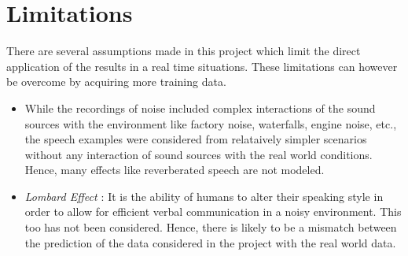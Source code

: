 
\section{Limitations}
There are several assumptions made in this project which limit the direct application of the results in a real time situations. These limitations can however be overcome by acquiring more training data.
\begin{itemize}
\item While the recordings of noise included complex interactions of the sound sources with the environment like factory noise, waterfalls, engine noise, etc., the speech examples were considered from relataively simpler scenarios without any interaction of sound sources with the real world conditions. Hence, many effects like reverberated speech are not modeled.
\item \textit{Lombard Effect \cite{wiki:lom}}: It is the ability of humans to alter their speaking style in order to allow for efficient verbal communication in a noisy environment. This too has not been considered. Hence, there is likely to be a mismatch between the prediction of the data considered in the project with the real world data.
\end{itemize}